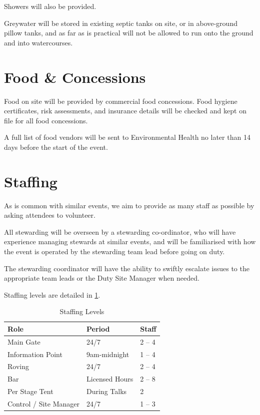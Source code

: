 Showers will also be provided.

Greywater will be stored in existing septic tanks on site, or in above-ground pillow tanks,
and as far as is practical will not be allowed to run onto the ground and into watercourses.

\section{Food \& Concessions}\label{food}

Food on site will be provided by commercial food concessions. Food hygiene certificates,
risk assessments, and insurance details will be checked and kept on file for all food
concessions. 

A full list of food vendors will be sent to Environmental Health no later than 14 days before
the start of the event.

\section{Staffing}

As is common with similar events, we aim to provide as many staff as possible
by asking attendees to volunteer. 

All stewarding will be overseen by a stewarding co-ordinator, who
will have experience managing stewards at similar events, and will be familiarised
with how the event is operated by the stewarding team lead before going on duty.

The stewarding coordinator will have the ability to swiftly
escalate issues to the appropriate team leads or the Duty Site Manager when needed.

Staffing levels are detailed in \cref{table:staff}.

\begin{table}[h!]
\caption{Staffing Levels}
\label{table:staff}
\centering
\begin{tabular}{| l l l |}
    \hline
    \textbf{Role} & \textbf{Period} & \textbf{Staff} \\
    \hline
    Main Gate & 24/7 & 2 -- 4 \\
    Information Point & 9am-midnight & 1 -- 4 \\
    Roving & 24/7 & 2 -- 4 \\
    Bar & Licensed Hours & 2 -- 8 \\
    Per Stage Tent & During Talks & 2 \\
    Control / Site Manager & 24/7 & 1 -- 3 \\
    \hline
\end{tabular}
\end{table}


